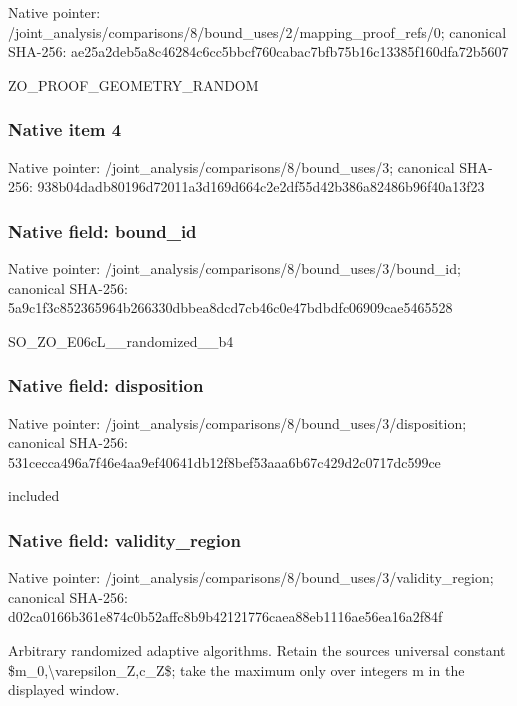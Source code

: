 \documentclass[10pt,a4paper]{article}
\begin{document}
Native pointer: /joint\_analysis/comparis\allowbreak{}ons/8/bound\_uses/2/mappi\allowbreak{}ng\_proof\_refs/0; canonical SHA-256: ae25a2deb5a8c46284c6cc5b\allowbreak{}bcf760cabac7bfb75b16c133\allowbreak{}85f160dfa72b5607


ZO\_PROOF\_GEOMETRY\_RANDOM


\subsubsection{Native item 4}


Native pointer: /joint\_analysis/comparis\allowbreak{}ons/8/bound\_uses/3; canonical SHA-256: 938b04dadb80196d72011a3d\allowbreak{}169d664c2e2df55d42b386a8\allowbreak{}2486b96f40a13f23



\subsubsection{Native field: bound\_id}


Native pointer: /joint\_analysis/comparis\allowbreak{}ons/8/bound\_uses/3/bound\allowbreak{}\_id; canonical SHA-256: 5a9c1f3c852365964b266330\allowbreak{}dbbea8dcd7cb46c0e47bdbdf\allowbreak{}c06909cae5465528


SO\_ZO\_E06cL\_\_randomized\_\_b4


\subsubsection{Native field: disposition}


Native pointer: /joint\_analysis/comparis\allowbreak{}ons/8/bound\_uses/3/dispo\allowbreak{}sition; canonical SHA-256: 531cecca496a7f46e4aa9ef4\allowbreak{}0641db12f8bef53aaa6b67c4\allowbreak{}29d2c0717dc599ce


included


\subsubsection{Native field: validity\_region}


Native pointer: /joint\_analysis/comparis\allowbreak{}ons/8/bound\_uses/3/valid\allowbreak{}ity\_region; canonical SHA-256: d02ca0166b361e874c0b52af\allowbreak{}fc8b9b42121776caea88eb11\allowbreak{}16ae56ea16a2f84f


Arbitrary randomized adaptive algorithms. Retain the sources universal constant \$m\_0,\textbackslash{}varepsilon\_Z,c\_Z\$; take the maximum only over integers m in the displayed window.
\end{document}
